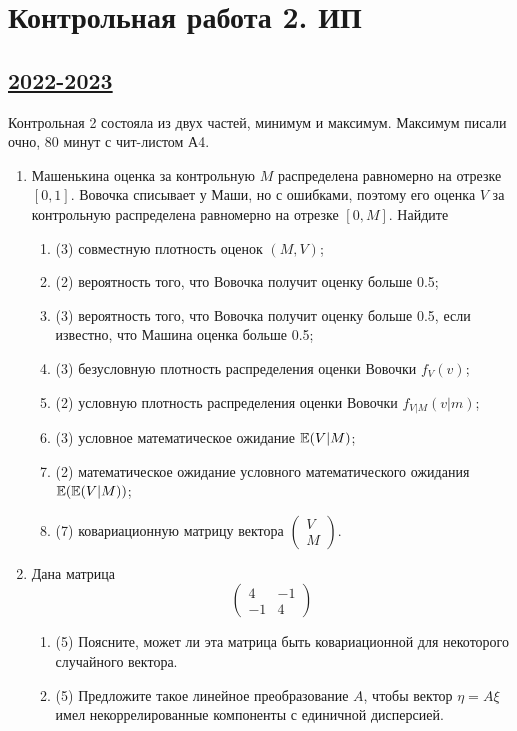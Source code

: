 \newpage
\thispagestyle{empty}
\section{Контрольная работа 2. ИП}


\subsection[2022-2023]{\hyperref[sec:sol_kr_02_ip_2022_2023]{2022-2023}}
\label{sec:kr_02_ip_2022_2023}

Контрольная 2 состояла из двух частей, минимум и максимум.
Максимум писали очно, 80 минут с чит-листом А4. 

\begin{enumerate}
	\item Машенькина оценка за контрольную $M$ распределена равномерно на отрезке $[0,1]$. Вовочка списывает у Маши, но с ошибками, поэтому его оценка $V$ за контрольную распределена равномерно на отрезке $[0, M]$.
	Найдите
		\begin{enumerate}
	\item (3) совместную плотность оценок $(M,V)$; 
	\item (2) вероятность того, что Вовочка получит оценку больше 0.5;
	\item (3) вероятность того, что Вовочка получит оценку больше 0.5, если известно, что Машина оценка больше 0.5;
	\item (3) безусловную плотность распределения оценки Вовочки $f_V (v)$;
	\item (2) условную плотность распределения оценки Вовочки $f_{V|M} (v|m)$;
	\item (3) условное математическое ожидание $\operatorname{\mathbb{E}}(V|M)$;
	\item (2) математическое ожидание условного математического ожидания $\operatorname{\mathbb{E}}(\operatorname{\mathbb{E}}(V|M))$;
	\item (7) ковариационную матрицу вектора $\left(\begin{array}{c}
		V \\
		M
	\end{array}\right)$.
\end{enumerate}

\item Дана матрица 
\[\left(\begin{array}{cc}
	4 & -1 \\
	-1 & 4
\end{array}\right)
\]
	\begin{enumerate}
		\item (5) Поясните, может ли эта матрица быть ковариационной для некоторого случайного вектора.
		\item (5) Предложите такое линейное преобразование $A$, чтобы вектор $\eta=A\xi$ имел 
		некоррелированные компоненты с единичной дисперсией.
	\end{enumerate}
	

\end{enumerate}
